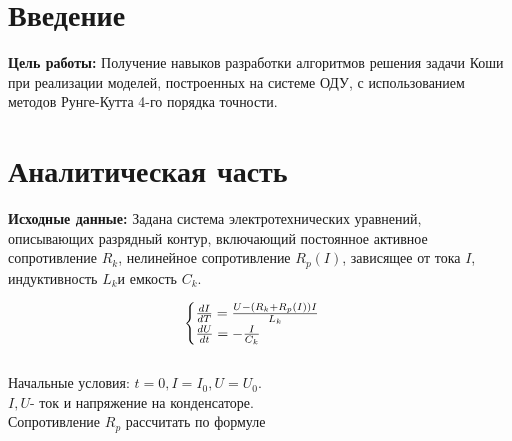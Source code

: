 \documentclass[a4paper, 12pt]{article}
\begin{document}
\section*{Введение}

	\textbf{Цель работы:} Получение навыков разработки  алгоритмов решения задачи Коши при реализации моделей, построенных на системе ОДУ, с использованием методов Рунге-Кутта 4-го порядка точности.
 
	

\clearpage
\newpage
\section{Аналитическая часть}
	\textbf{Исходные данные:} Задана система электротехнических уравнений, описывающих разрядный контур, включающий постоянное активное сопротивление $R_k$, нелинейное сопротивление $R_p (I)$, зависящее от тока $I$,  индуктивность $L_k$и емкость $C_k$.
	
	\begin{equation*} 
		\begin{cases}
			
			\frac{dI}{dT} = \frac{U -(R_k + R_p(I))I }{L_k}\\
			\Large \frac{dU}{dt} = - \frac{I}{C_k}
		\end{cases}
	\end{equation*}
	\\Начальные условия: $t = 0, I = I_0, U = U_0$.
	\\$I, U$- ток и напряжение на конденсаторе.
	\\Сопротивление $R_p$ рассчитать по формуле
	
\end{document}
